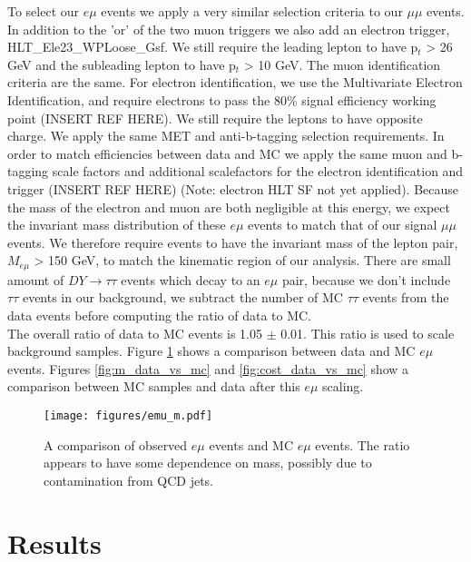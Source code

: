 \documentclass[
    10pt, %
    a4paper, %
    oneside, %
    headinclude,footinclude, %
    BCOR5mm, %
]{scrartcl}
\begin{document}
    To select our $e \mu$ events we apply a very similar selection criteria to our $\mu \mu$ events. 
    In addition to the 'or' of the two muon triggers 
    we also add an electron trigger, HLT\_Ele23\_WPLoose\_Gsf.
    We still require the leading lepton to have p$_t$ > 26 GeV and the subleading lepton
    to have p$_t$ > 10 GeV. The muon identification criteria are the same.
    For electron identification, we use the Multivariate Electron Identification, and require 
    electrons to pass the 80\% signal efficiency working point (INSERT REF HERE).
    We still require the leptons to have opposite charge. 
    We apply the same MET and anti-b-tagging selection requirements. 
    In order to match efficiencies between data and MC we apply the same muon and b-tagging scale 
    factors and additional scalefactors for the electron identification and trigger (INSERT REF HERE)
    (Note: electron HLT SF not yet applied).
    Because the mass of the electron and muon are both negligible at this energy, we expect the
    invariant mass distribution of these $e \mu$ events to match that of our signal $\mu \mu$ events.
    We therefore require events to have the invariant mass of the lepton pair, $M_{e\mu}$ > 150 GeV, 
    to match the kinematic region of our analysis. 
    There are small amount of $DY \rightarrow \tau \tau$ events which decay to an $e \mu$ pair,
    because we don't include $\tau \tau$ events in our background, we subtract the number of MC 
    $\tau \tau$ events from the data events before computing the ratio of data to MC. \\

    The overall ratio of data to MC events is 1.05 $\pm$ 0.01. This ratio is used to scale
    background samples. 
    Figure \ref{fig:emu} shows a comparison between data and MC $e \mu$ events.
    Figures \ref{fig:m_data_vs_mc} and \ref{fig:cost_data_vs_mc} show a comparison 
    between MC samples and data after this $e \mu$ scaling. 


    \begin{figure}[H]
        \centering
        \texttt{[image: figures/emu\_m.pdf]}
        \caption{A comparison of observed $e \mu$ events and MC $e \mu$ events. The ratio
        appears to have some dependence on mass, possibly due to contamination from QCD jets.}
        \label{fig:emu}
    \end{figure}
    




    \newpage
    \section{Results}
\end{document}
